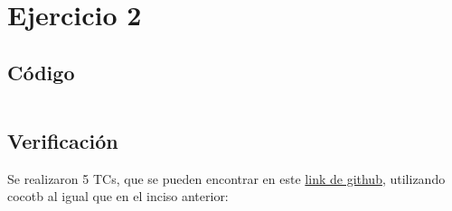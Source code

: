\section{Ejercicio 2}
\subsection{Código}
\inputminted[fontsize=\footnotesize]{systemverilog}{../arith_operator/rtl/arith_operator.sv}

\subsection{Verificación}
Se realizaron 5 TCs, que se pueden encontrar en este \href{https://github.com/msebgarcia/DDA2024/blob/main/GP01/arith_operator/tb/test_module.py}{link de github}, utilizando cocotb al igual que en el inciso anterior:
